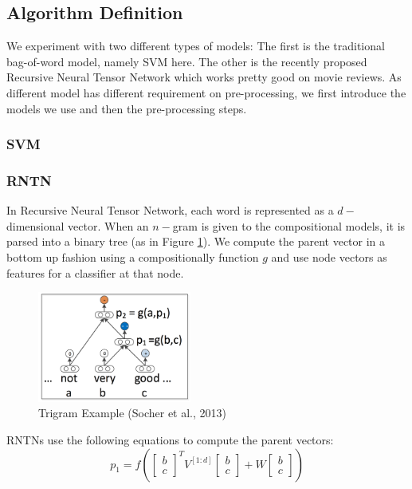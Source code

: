 \subsection{Algorithm Definition}
We experiment with two different types of models: The first is the traditional bag-of-word model, namely SVM here. The other is the recently proposed Recursive Neural Tensor Network which works pretty good on movie reviews. As different model has different requirement on pre-processing, we first introduce the models we use and then the pre-processing steps. 


\subsubsection{SVM}

\newpage

\subsubsection{RNTN}
In Recursive Neural Tensor Network, each word is represented as a $d-$dimensional vector. When an $n-$gram is given to the compositional models, it is parsed into a binary tree (as in Figure \ref{trigram}). We compute the parent vector in a bottom up fashion using a compositionally function $g$ and use node vectors as features for a classifier at that node. 
\begin{figure}[H]
\begin{center}
\includegraphics[width = 0.45\textwidth]{pic/trigram.png}
\caption{\label{trigram}Trigram Example (Socher et al., 2013) }
\end{center}
\end{figure}

RNTNs use the following equations to compute the parent vectors: 
\begin{equation*}
p_1 = f \left(  
\begin{bmatrix}
b \\ c
\end{bmatrix}^T
V^{[1:d]} 
\begin{bmatrix}
b \\ c
\end{bmatrix}
+ W
\begin{bmatrix}
b \\ c
\end{bmatrix}
 \right)
\end{equation*}
 
